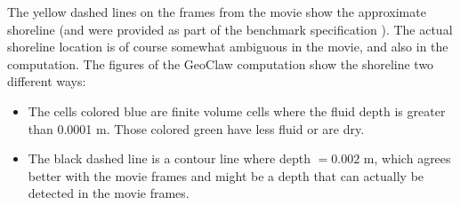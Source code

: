 The yellow dashed lines on the frames from the movie show the approximate
shoreline (and were provided as part of the benchmark specification
\cite{bp-description}).  The actual shoreline location is of course somewhat
ambiguous in the movie, and also in the computation.  The figures of the
GeoClaw computation show the shoreline two different ways:
\begin{itemize}
\item The cells colored blue are finite volume cells where the fluid depth is
greater than 0.0001 m. Those colored green have less fluid or are dry.
\item The black dashed line is a contour line where depth $= 0.002$ m, which
agrees better with the movie frames and might be a depth that can actually be
detected in the movie frames.
\end{itemize} 

